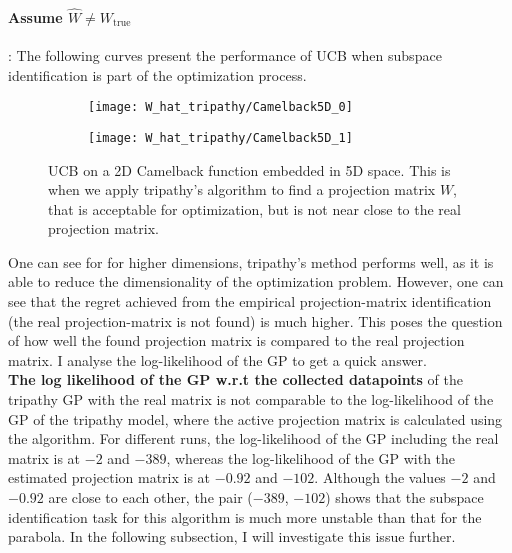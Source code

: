 \paragraph{Assume $\hat{W} \neq W_{\text{true}}$}: The following curves present the performance of UCB when subspace identification is part of the optimization process.

\begin{figure}[H]
    \centering
    \begin{subfigure}[b]{0.40\textwidth}
        \texttt{[image: W\_hat\_tripathy/Camelback5D\_0]}
        \label{fig:gull}
    \end{subfigure}
    \begin{subfigure}[b]{0.40\textwidth}
        \texttt{[image: W\_hat\_tripathy/Camelback5D\_1]}
        \label{fig:tiger}
    \end{subfigure}   
           \caption{UCB on a 2D Camelback function embedded in 5D space.
  This is when we apply tripathy's algorithm to find a projection matrix $W$, that is acceptable for optimization, but is not near close to the real projection matrix.}
\end{figure}

One can see for for higher dimensions, tripathy's method performs well, as it is able to reduce the dimensionality of the optimization problem.
However, one can see that the regret achieved from the empirical projection-matrix identification (the real projection-matrix is not found) is much higher.
This poses the question of how well the found projection matrix is compared to the real projection matrix.
I analyse the log-likelihood of the GP to get a quick answer. \\

\textbf{The log likelihood of the GP w.r.t the collected datapoints} of the tripathy GP with the real matrix is not comparable to the log-likelihood of the GP of the tripathy model, where the active projection matrix is calculated using the algorithm.
For different runs, the log-likelihood of the GP including the real matrix is at $-2$ and $-389$, whereas the log-likelihood of the GP with the estimated projection matrix is at $-0.92$ and $-102$. 
Although the values $-2$ and $-0.92$ are close to each other, the pair ($-389$, $-102$) shows that the subspace identification task for this algorithm is much more unstable than that for the parabola.
In the following subsection, I will investigate this issue further.

